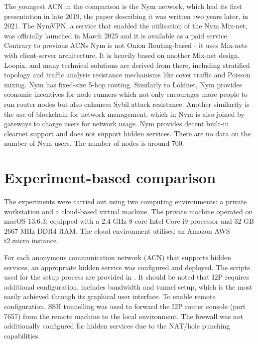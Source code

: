 The youngest ACN in the comparison is the Nym network, which had its first presentation in late 2019, the paper describing it was written two years later, in 2021. The NymVPN, a service that enabled the utilisation of the Nym Mix-net, was officially launched in March 2025 and it is available as a paid service. Contrary to previous ACNs Nym is not Onion Routing-based - it uses Mix-nets with client-server architecture. It is heavily based on another Mix-net design, Loopix, and many technical solutions are derived from there, including stratified topology and traffic analysis resistance mechanisms like cover traffic and Poisson mixing. Nym has fixed-size 5-hop routing. Similarly to Lokinet, Nym provides economic incentives for node runners which not only encourages more people to run router nodes but also enhances Sybil attack resistance. Another similarity is the use of blockchain for network management, which in Nym is also joined by gateways to charge users for network usage. Nym provides decent built-in clearnet support and does not support hidden services. There are no data on the number of Nym users. The number of nodes is around 700.

\section{Experiment-based comparison}

The experiments were carried out using two computing environments: a private workstation and a cloud-based virtual machine. The private machine operated on macOS 13.6.3, equipped with a 2.4 GHz 8-core Intel Core i9 processor and 32 GB 2667 MHz DDR4 RAM. The cloud environment utilised an Amazon AWS t2.micro instance.

For each anonymous communication network (ACN) that supports hidden services, an appropriate hidden service was configured and deployed. The scripts used for the setup process are provided in . It should be noted that I2P requires additional configuration, includes bandwidth and tunnel setup, which is the most easily achieved through its graphical user interface. To enable remote configuration, SSH tunnelling was used to forward the I2P router console (port 7657) from the remote machine to the local environment. The firewall was not additionally configured for hidden services due to the NAT/hole punching capabilities.

